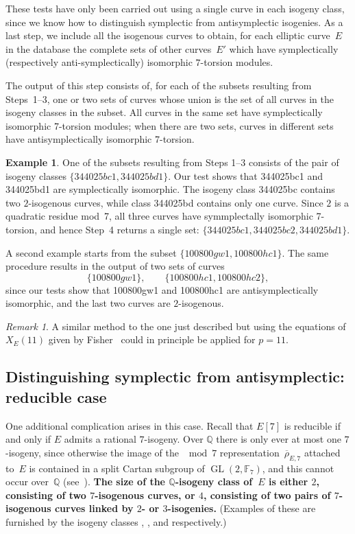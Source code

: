 \documentclass[12pt]{amsart}
\newcommand{\lmfdbeciso}[2]{\href{http://www.lmfdb.org/EllipticCurve/Q/#1/#2}{\text{\rm#1.#2}}}
\newcommand{\F}{\mathbb{F}}
\newcommand{\Q}{\mathbb{Q}}
\newcommand{\rhobar}{{\overline{\rho}}}
\newcommand{\GL}{\operatorname{GL}}
\numberwithin{equation}{section}
\theoremstyle{definition}
\newtheorem{example}[theorem]{Example}
\theoremstyle{remark}
\newtheorem{remark}[theorem]{Remark}
\begin{document}
These tests have only been carried out using a single curve in each
isogeny class, since we know how to distinguish symplectic from
antisymplectic isogenies.  As a last step, we include all the
isogenous curves to obtain, for each elliptic curve~$E$ in the
database the complete sets of other curves~$E'$ which have
symplectically (respectively anti-symplectically) isomorphic
$7$-torsion modules.

The output of this step consists of, for each of the subsets resulting
from Steps~1--3, one or two sets of curves whose union is the set of
all curves in the isogeny classes in the subset.  All curves in the
same set have symplectically isomorphic 7-torsion modules; when there
are two sets, curves in different sets have antisymplectically
isomorphic 7-torsion.

\begin{example}
One of the subsets resulting from Steps 1--3 consists of the pair of
isogeny classes $\{344025bc1, 344025bd1\}$.  Our test shows that
344025bc1 and 344025bd1 are symplectically isomorphic.  The isogeny
class 344025bc contains two $2$-isogenous curves, while class 344025bd
contains only one curve.  Since $2$ is a quadratic residue mod~7, all
three curves have symmplectally isomorphic 7-torsion, and hence Step~4
returns a single set: $\{344025bc1, 344025bc2, 344025bd1\}$.

 A second example starts from the subset $\{100800gw1, 100800hc1\}$.
The same procedure results in the output of two sets of curves
\[
\{100800gw1\}, \qquad \{100800hc1, 100800hc2\},
\]
since our tests show that 100800gw1 and 100800hc1 are
antisymplectically isomorphic, and the last two curves are
$2$-isogenous.
\end{example}

\begin{remark}
A similar method to the one just described but using the equations of
$X_E(11)$ given by Fisher~\cite{Fisher} could in principle be applied
for $p=11$.
\end{remark}

\subsection{Distinguishing symplectic from antisymplectic: reducible
  case}

One additional complication arises in this case.  Recall that $E[7]$
is reducible if and only if $E$ admits a rational $7$-isogeny.  Over
$\Q$ there is only ever at most one $7$-isogeny, since otherwise the
image of the $\mod{7}$ representation~$\rhobar_{E,7}$ attached to~$E$ is contained in
a split Cartan subgroup of $\GL(2,\F_7)$, and this cannot occur
over~$\Q$ (see~\cite[Theorem~1.1]{GL}). {\bf The size of the $\Q$-isogeny class of~$E$ is either $2$, consisting of two $7$-isogenous curves,
or $4$, consisting of two pairs of $7$-isogenous curves linked by
$2$-{} or $3$-isogenies.}  (Examples of these are furnished by the
isogeny classes \lmfdbeciso{26}{b}, \lmfdbeciso{49}{a}, and
\lmfdbeciso{162}{b} respectively.) 
\end{document}
